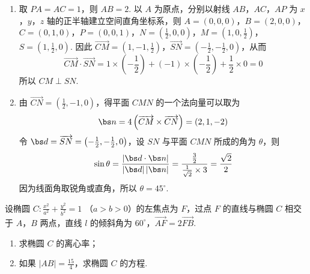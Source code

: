 \begin{solution}
\begin{enumerate}
\item 取 \(PA=AC=1\)，则 \(AB=2\). 以 \(A\) 为原点，分别以射线 \(AB\)，\(AC\)，\(AP\) 为 \(x\)，\(y\)，\(z\) 轴的正半轴建立空间直角坐标系，则 \(A=(0,0,0)\)，\(B=(2,0,0)\)，\(C=(0,1,0)\)，\(P=(0,0,1)\)，\(N=\left(\frac{1}{2},0,0\right)\)，\(M=\left(1,0,\frac{1}{2}\right)\)，\(S=\left(1,\frac{1}{2},0\right)\). 因此 \(\overrightarrow{CM}=\left(1,-1,\frac{1}{2}\right)\)，\(\overrightarrow{SN}=\left(-\frac{1}{2},-\frac{1}{2},0\right)\)，从而
\[
\overrightarrow{CM}\cdot\overrightarrow{SN}=1\times\left(-\frac{1}{2}\right)+(-1)\times\left(-\frac{1}{2}\right)+\frac{1}{2}\times0=0
\]
所以 \(CM\perp SN\).
\item 由 \(\overrightarrow{CN}=\left(\frac{1}{2},-1,0\right)\)，得平面 \(CMN\) 的一个法向量可以取为
\[
\bs n=4\left(\overrightarrow{CM}\times\overrightarrow{CN}\right)=(2,1,-2)
\]
令 \(\bs d=\overrightarrow{SN}=\left(-\frac{1}{2},-\frac{1}{2},0\right)\)，设 \(SN\) 与平面 \(CMN\) 所成的角为 \(\theta\)，则
\[
\sin\theta=\frac{|\bs d\cdot\bs n|}{|\bs d|\,|\bs n|}=\frac{\frac{3}{2}}{\frac{1}{\sqrt{2}}\times3}=\frac{\sqrt{2}}{2}
\]
因为线面角取锐角或直角，所以 \(\theta=45^{\circ}\).
\end{enumerate}
\end{solution}

\begin{problem}
设椭圆 \(C: \frac{x^{2}}{a^{2}} + \frac{y^{2}}{b^{2}} = 1\) （\(a > b > 0\)）的左焦点为 \(F\)，过点 \(F\) 的直线与椭圆 \(C\) 相交于 \(A\)，\(B\) 两点，直线 \(l\) 的倾斜角为 \(60^\circ\)，\(\overrightarrow{AF} = 2\overrightarrow{FB}\).

\begin{enumerate}
\item 求椭圆 \(C\) 的离心率；
\item 如果 \(\left|AB\right| = \frac{15}{4}\)，求椭圆 \(C\) 的方程.
\end{enumerate}
\end{problem}

